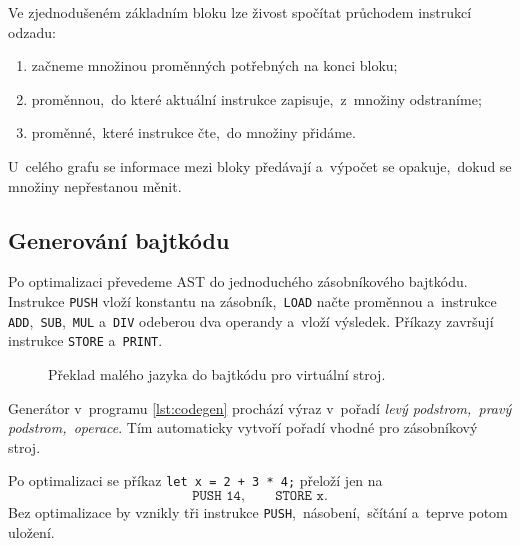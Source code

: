Ve zjednodušeném základním bloku lze živost spočítat průchodem instrukcí odzadu:
\begin{enumerate}
    \item začneme množinou proměnných potřebných na konci bloku;
    \item proměnnou,~do které aktuální instrukce zapisuje,~z~množiny odstraníme;
    \item proměnné,~které instrukce čte,~do množiny přidáme.
\end{enumerate}
U~celého grafu se informace mezi bloky předávají a~výpočet se opakuje,~dokud se množiny nepřestanou měnit.

\subsection{Generování bajtkódu}

Po optimalizaci převedeme AST do jednoduchého zásobníkového bajtkódu. Instrukce \texttt{PUSH} vloží konstantu na zásobník,~\texttt{LOAD} načte proměnnou a~instrukce \texttt{ADD},~\texttt{SUB},~\texttt{MUL} a~\texttt{DIV} odeberou dva operandy a~vloží výsledek. Příkazy završují instrukce \texttt{STORE} a~\texttt{PRINT}.

\begin{figure}[h]
    \centering
    
    \caption{Překlad malého jazyka do bajtkódu pro virtuální stroj.}
    \label{fig:preklad-bajtkod}
\end{figure}

Generátor v~programu \ref{lst:codegen} prochází výraz v~pořadí \emph{levý podstrom,~pravý podstrom,~operace}. Tím automaticky vytvoří pořadí vhodné pro zásobníkový stroj.



Po optimalizaci se příkaz \texttt{let x = 2 + 3 * 4;} přeloží jen na
\[
    \texttt{PUSH 14},\qquad \texttt{STORE x}.
\]
Bez optimalizace by vznikly tři instrukce \texttt{PUSH},~násobení,~sčítání a~teprve potom uložení.
